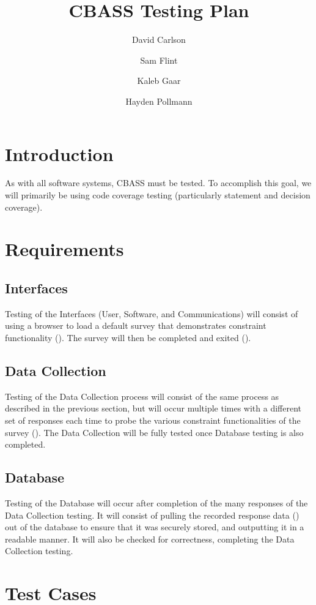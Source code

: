 \documentclass[10pt]{article}
\title{CBASS Testing Plan}
\author{David Carlson \and Sam Flint \and Kaleb Gaar \and Hayden
  Pollmann}
\begin{document}
\maketitle

\section{Introduction}

As with all software systems, CBASS must be tested.  To accomplish
this goal, we will primarily be using code coverage testing
(particularly statement and decision coverage).

\section{Requirements}

\subsection{Interfaces}
Testing of the Interfaces (User, Software, and Communications) will
consist of using a browser to load a default survey that demonstrates
constraint functionality (). The survey will then be
completed and exited ().

\subsection{Data Collection}
Testing of the Data Collection process will consist of the same
process as described in the previous section, but will occur multiple
times with a different set of responses each time to probe the various
constraint functionalities of the survey (). The Data
Collection will be fully tested once Database testing is also
completed.

\subsection{Database}
Testing of the Database will occur after completion of the many
responses of the Data Collection testing. It will consist of pulling
the recorded response data () out of the database to
ensure that it was securely stored, and outputting it in a readable
manner. It will also be checked for correctness, completing the Data
Collection testing.


\section{Test Cases}
\end{document}

